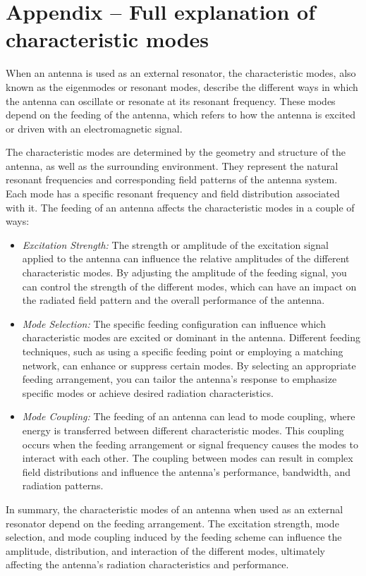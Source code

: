 \documentclass[11pt,a4paper]{article}
\begin{document}
\appendix
\newpage\section{\label{sec:appendix-characteristic-modes}Appendix -- Full explanation of characteristic modes}
When an antenna is used as an external resonator, the characteristic modes, also known as the eigenmodes or resonant modes, describe the different ways in which the antenna can oscillate or resonate at its resonant frequency. These modes depend on the feeding of the antenna, which refers to how the antenna is excited or driven with an electromagnetic signal.

The characteristic modes are determined by the geometry and structure of the antenna, as well as the surrounding environment. They represent the natural resonant frequencies and corresponding field patterns of the antenna system. Each mode has a specific resonant frequency and field distribution associated with it. The feeding of an antenna affects the characteristic modes in a couple of ways:
\begin{itemize}
    \item \emph{Excitation Strength:} The strength or amplitude of the excitation signal applied to the antenna can influence the relative amplitudes of the different characteristic modes. By adjusting the amplitude of the feeding signal, you can control the strength of the different modes, which can have an impact on the radiated field pattern and the overall performance of the antenna.
    \item \emph{Mode Selection:} The specific feeding configuration can influence which characteristic modes are excited or dominant in the antenna. Different feeding techniques, such as using a specific feeding point or employing a matching network, can enhance or suppress certain modes. By selecting an appropriate feeding arrangement, you can tailor the antenna's response to emphasize specific modes or achieve desired radiation characteristics.
    \item \emph{Mode Coupling:} The feeding of an antenna can lead to mode coupling, where energy is transferred between different characteristic modes. This coupling occurs when the feeding arrangement or signal frequency causes the modes to interact with each other. The coupling between modes can result in complex field distributions and influence the antenna's performance, bandwidth, and radiation patterns.
\end{itemize}
In summary, the characteristic modes of an antenna when used as an external resonator depend on the feeding arrangement. The excitation strength, mode selection, and mode coupling induced by the feeding scheme can influence the amplitude, distribution, and interaction of the different modes, ultimately affecting the antenna's radiation characteristics and performance.
\end{document}
